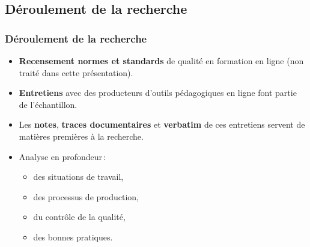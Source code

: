                        	\subsection{Déroulement de la recherche} 
					\begin{frame}[allowframebreaks]
						\frametitle{Déroulement de la recherche}
                        
                        			\begin{itemize} 
                       				 \item \textbf{Recensement normes et standards} de qualité en formation en ligne (non traité dans cette présentation).
                       				 \item \textbf{Entretiens} avec des producteurs d’outils pédagogiques en ligne font partie de l’échantillon.
                       				 \item Les \textbf{notes}, \textbf{traces documentaires} et \textbf{verbatim} de ces entretiens servent de matières premières à la recherche.
                       				 \item Analyse en profondeur\,:
                       				 \begin{itemize} 
                       				 	\item des situations de travail, 
                       				 	\item des processus de production,
                       				 	\item du contrôle de la qualité,
                       				 	\item des bonnes pratiques.
                       				 \end{itemize}
                       		 \end{itemize}

             
                \end{frame}
